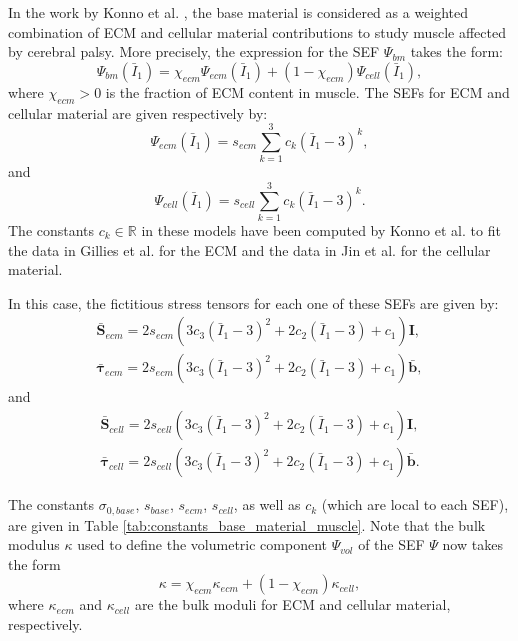 \documentclass{sfuthesis}
\numberwithin{equation}{section}
\numberwithin{figure}{chapter}
\numberwithin{table}{chapter}
\theoremstyle{definition}
\def\*#1{{\mathbf{#1}}} %
\newcommand{\R}{\mathbb{R}}
\newcommand{\I}{{\bar{I}}}
\def\btau{{\bm{\tau}}}
\begin{document}
In the work by Konno et al. \cite{KonnoNigamWakeling2021_ECM}, the base material is considered as a weighted combination of ECM and cellular material contributions to study muscle affected by cerebral palsy. More precisely, the expression for the SEF $\Psi_{bm}$ takes the form:
\begin{equation}
    \Psi_{bm}(\I_1) = \chi_{ecm} \Psi_{ecm}(\I_1) + (1-\chi_{ecm}) \Psi_{cell}(\I_1),
\end{equation}
where $\chi_{ecm} > 0$ is the fraction of ECM content in muscle. The SEFs for ECM and cellular material are given respectively by:
\begin{equation}\label{eq:def_Psi_ecm}
    \Psi_{ecm}(\I_1) = s_{ecm} \sum_{k=1}^3 c_k (\I_1 - 3)^k,
\end{equation}
and
\begin{equation}\label{eq:def_Psi_cell}
    \Psi_{cell}(\I_1) = s_{cell} \sum_{k=1}^3 c_k (\I_1 - 3)^k.
\end{equation}
The constants $c_k \in \R$ in these models have been computed by Konno et al. \cite{KonnoNigamWakeling2021_ECM} to fit the data in Gillies et al. \cite{Gillies2011} for the ECM and the data in Jin et al. \cite{Jin2013} for the cellular material.

In this case, the fictitious stress tensors for each one of these SEFs are given by:
\begin{gather}
    \bar{\*S}_{ecm} = 2s_{ecm} \left( 3c_3(\I_1-3)^2 + 2c_2 (\I_1-3) + c_1 \right) \*I, \\
    \bar{\btau}_{ecm} = 2s_{ecm} \left( 3c_3(\I_1-3)^2 + 2c_2 (\I_1-3) + c_1 \right) \bar{\*b},
\end{gather}
and
\begin{gather}
    \bar{\*S}_{cell} = 2s_{cell} \left( 3c_3(\I_1-3)^2 + 2c_2 (\I_1-3) + c_1 \right) \*I, \\
    \bar{\btau}_{cell} = 2s_{cell} \left( 3c_3(\I_1-3)^2 + 2c_2 (\I_1-3) + c_1 \right) \bar{\*b}.
\end{gather}

The constants $\sigma_{0,base}$, $s_{base}$, $s_{ecm}$, $s_{cell}$, as well as $c_k$ (which are local to each SEF), are given in Table \ref{tab:constants_base_material_muscle}. Note that the bulk modulus $\kappa$ used to define the volumetric component $\Psi_{vol}$ of the SEF $\Psi$ now takes the form
\begin{equation} \label{eq:def_kappa_ecm_cell}
    \kappa = \chi_{ecm} \kappa_{ecm} + (1-\chi_{ecm}) \kappa_{cell},
\end{equation}
where $\kappa_{ecm}$ and $\kappa_{cell}$ are the bulk moduli for ECM and cellular material, respectively.
\end{document}

